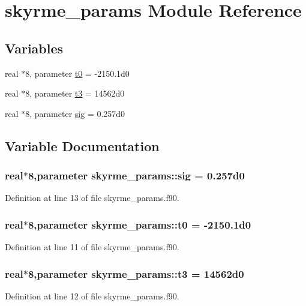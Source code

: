 \hypertarget{namespaceskyrme__params}{
\section{skyrme\_\-params Module Reference}
\label{namespaceskyrme__params}
}
\subsection*{Variables}
\begin{DoxyCompactItemize}
\item 
real $\ast$8, parameter \hyperlink{namespaceskyrme__params_a762b9bc56e40177d39d6c7eaccbbd7c7}{t0} = -\/2150.1d0
\item 
real $\ast$8, parameter \hyperlink{namespaceskyrme__params_af9d6dccd73b59afa0400c04cccfd3ed9}{t3} = 14562d0
\item 
real $\ast$8, parameter \hyperlink{namespaceskyrme__params_af2468404197070ae2e6169ff25106d0a}{sig} = 0.257d0
\end{DoxyCompactItemize}


\subsection{Variable Documentation}
\hypertarget{namespaceskyrme__params_af2468404197070ae2e6169ff25106d0a}{
\subsubsection[{sig}]{\setlength{\rightskip}{0pt plus 5cm}real$\ast$8,parameter {\bf skyrme\_\-params::sig} = 0.257d0}}
\label{namespaceskyrme__params_af2468404197070ae2e6169ff25106d0a}


Definition at line 13 of file skyrme\_\-params.f90.

\hypertarget{namespaceskyrme__params_a762b9bc56e40177d39d6c7eaccbbd7c7}{
\subsubsection[{t0}]{\setlength{\rightskip}{0pt plus 5cm}real$\ast$8,parameter {\bf skyrme\_\-params::t0} = -\/2150.1d0}}
\label{namespaceskyrme__params_a762b9bc56e40177d39d6c7eaccbbd7c7}


Definition at line 11 of file skyrme\_\-params.f90.

\hypertarget{namespaceskyrme__params_af9d6dccd73b59afa0400c04cccfd3ed9}{
\subsubsection[{t3}]{\setlength{\rightskip}{0pt plus 5cm}real$\ast$8,parameter {\bf skyrme\_\-params::t3} = 14562d0}}
\label{namespaceskyrme__params_af9d6dccd73b59afa0400c04cccfd3ed9}


Definition at line 12 of file skyrme\_\-params.f90.

